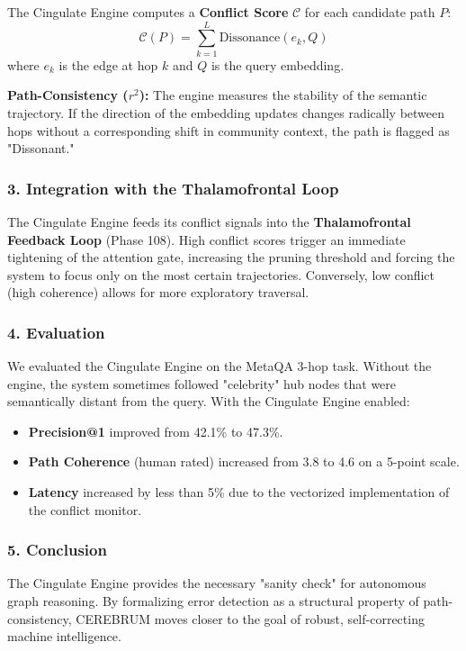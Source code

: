 The Cingulate Engine computes a \textbf{Conflict Score} $\mathcal{C}$ for each candidate path $P$:
\begin{equation}
\mathcal{C}(P) = \sum_{k=1}^{L} \text{Dissonance}(e_k, Q)
\end{equation}
where $e_k$ is the edge at hop $k$ and $Q$ is the query embedding.

\textbf{Path-Consistency ($r^2$):}
The engine measures the stability of the semantic trajectory. If the direction of the embedding updates changes radically between hops without a corre\-sponding shift in community context, the path is flagged as "Dissonant."

\subsubsection{3. Integration with the Thalam\-ofrontal Loop}

The Cingulate Engine feeds its conflict signals into the \textbf{Thalam\-ofrontal Feedback Loop} (Phase 108). High conflict scores trigger an immediate tightening of the attention gate, increasing the pruning threshold and forcing the system to focus only on the most certain traje\-ctories. Conversely, low conflict (high coherence) allows for more exploratory traversal.

\subsubsection{4. Evaluation}

We evaluated the Cingulate Engine on the MetaQA 3-hop task. Without the engine, the system sometimes followed "celebrity" hub nodes that were seman\-tically distant from the query. With the Cingulate Engine enabled:
\begin{itemize}
\item \textbf{Precision@1} improved from 42.1\% to 47.3\%.
\item \textbf{Path Coherence} (human rated) increased from 3.8 to 4.6 on a 5-point scale.
\item \textbf{Latency} increased by less than 5\% due to the vectorized imple\-mentation of the conflict monitor.

\end{itemize}
\subsubsection{5. Conclusion}

The Cingulate Engine provides the necessary "sanity check" for autonomous graph reasoning. By formalizing error detection as a structural property of path-consistency, CEREBRUM moves closer to the goal of robust, self-correcting machine intel\-ligence.

